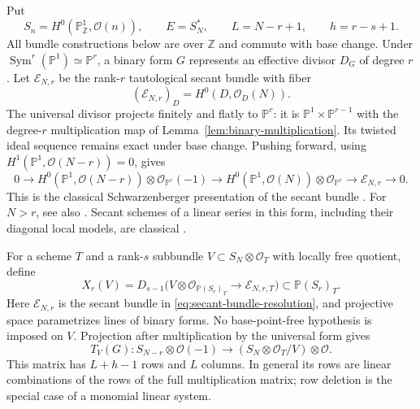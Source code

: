 \documentclass[10pt,fleqn]{article}
\numberwithin{equation}{section}
\newcommand{\PP}{\mathbb P}
\newcommand{\cE}{\mathcal E}
\begin{document}
Put
\[
 S_n=H^0(\PP^1_{\mathbb Z},\mathcal O(n)),\qquad
 E=S_N^*,\qquad L=N-r+1,\qquad h=r-s+1.
\]
All bundle constructions below are over $\mathbb Z$ and commute with
base change.
Under $\operatorname{Sym}^r(\PP^1)\simeq\PP^r$, a binary form $G$ represents an effective
divisor $D_G$ of degree $r$.  Let $\cE_{N,r}$ be the rank-$r$ tautological secant bundle with
fiber
\begin{equation*}
 (\cE_{N,r})_{D}=H^0(D,\mathcal O_D(N)).
\end{equation*}
The universal divisor projects finitely and flatly to $\PP^r$: it is
$\PP^1\times\PP^{r-1}$ with the degree-$r$ multiplication map of
Lemma~\ref{lem:binary-multiplication}.  Its twisted ideal sequence remains
exact under base change.  Pushing forward, using
$H^1(\PP^1,\mathcal O(N-r))=0$, gives
\begin{equation}\label{eq:secant-bundle-resolution}
 0\longrightarrow
 H^0(\PP^1,\mathcal O(N-r))\otimes\mathcal O_{\PP^r}(-1)
 \longrightarrow
 H^0(\PP^1,\mathcal O(N))\otimes\mathcal O_{\PP^r}
 \longrightarrow\cE_{N,r}\longrightarrow0.
\end{equation}
This is the classical Schwarzenberger presentation of the secant
bundle \cite{Schwarzenberger}. For $N>r$, see also
\cite[Section~2.2, equation~(2.5a), arXiv version]{RaicuSam}.
Secant schemes of a linear series in this form,
including their diagonal local models, are classical \cite{HuibregtseJohnsen}.

For a scheme $T$ and a rank-$s$ subbundle
$V\subset S_N\otimes\mathcal O_T$ with locally free quotient, define
\begin{equation}\label{v6:lin:degeneracy}
 X_r(V)=D_{s-1}\bigl(V\otimes\mathcal O_{\PP(S_r)_T}
                    \longrightarrow\cE_{N,r,T}\bigr)
 \subset\PP(S_r)_T.
\end{equation}
Here $\cE_{N,r}$ is the secant bundle in
\eqref{eq:secant-bundle-resolution}, and projective space parametrizes
lines of binary forms.  No base-point-free hypothesis is imposed on $V$.
Projection after multiplication by the universal form gives
\begin{equation}\label{v6:lin:projected-multiplication}
 T_V(G):S_{N-r}\otimes\mathcal O(-1)
       \longrightarrow (S_N\otimes\mathcal O_T/V)\otimes\mathcal O.
\end{equation}
This matrix has $L+h-1$ rows and $L$ columns.  In general its rows are
linear combinations of the rows of the full multiplication matrix;
row deletion is the special case of a monomial linear system.
\end{document}
